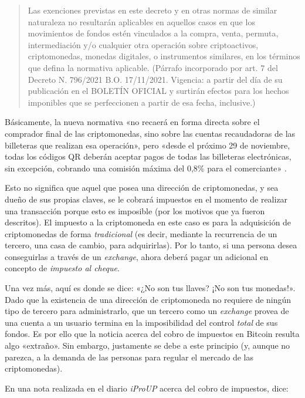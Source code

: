 \documentclass[12pt,a4paper,twoside]{book}
\begin{document}
\begin{quotation}
Las exenciones previstas en este decreto y en otras normas de similar naturaleza no resultarán aplicables en aquellos casos en que los movimientos de fondos estén vinculados a la compra, venta, permuta, intermediación y/o cualquier otra operación sobre criptoactivos, criptomonedas, monedas digitales, o instrumentos similares, en los términos que defina la normativa aplicable. (Párrafo incorporado por art. 7 del Decreto N. 796/2021 B.O. 17/11/2021. Vigencia: a partir del día de su publicación en el BOLETÍN OFICIAL y surtirán efectos para los hechos imponibles que se perfeccionen a partir de esa fecha, inclusive.) \cite{decreto:impuestocripto}
\end{quotation}

Básicamente, la nueva normativa «no recaerá en forma directa sobre el comprador final de las criptomonedas, sino sobre las cuentas recaudadoras de las billeteras que realizan esa operación», pero «desde el próximo 29 de noviembre, todas los códigos QR deberán aceptar pagos de todas las billeteras electrónicas, sin excepción, cobrando una comisión máxima del 0,8\% para el comerciante» \cite{impuestocripto}.

Esto no significa que aquel que posea una dirección de criptomonedas, y sea dueño de sus propias claves, se le cobrará impuestos en el momento de realizar una transacción porque esto es imposible (por los motivos que ya fueron descritos). El impuesto a la criptomoneda en este caso es para la adquisición de criptomonedas de forma \textit{tradicional} (es decir, mediante la recurrencia de un tercero, una casa de cambio, para adquirirlas). Por lo tanto, si una persona desea conseguirlas a través de un \textit{exchange}, ahora deberá pagar un adicional en concepto de \textit{impuesto al cheque}.

Una vez más, aquí es donde se dice: «¿No son tus llaves? ¡No son tus monedas!». Dado que la existencia de una dirección de criptomoneda no requiere de ningún tipo de tercero para administrarlo, que un tercero como un \textit{exchange} provea de una cuenta a un usuario termina en la imposibilidad del control \textit{total} de sus fondos. Es por ello que la noticia acerca del cobro de impuestos en Bitcoin resulta algo «extraño». Sin embargo, justamente se debe a este principio (y, aunque no parezca, a la demanda de las personas para regular el mercado de las criptomonedas).

En una nota realizada en el diario \textit{iProUP} acerca del cobro de impuestos, dice:
\end{document}

